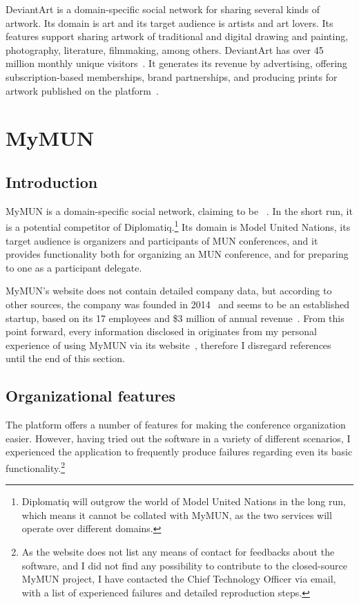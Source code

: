 DeviantArt is a domain-specific social network for sharing several kinds of artwork. Its domain is art and its target audience is artists and art lovers. Its features support sharing artwork of traditional and digital drawing and painting, photography, literature, filmmaking, among others. DeviantArt has over 45 million monthly unique visitors~\cite{about-deviantart}. It generates its revenue by advertising, offering subscription-based memberships, brand partnerships, and producing prints for artwork published on the platform~\cite{deviantart-revenue}.

\section{MyMUN}
\label{section:mymun}

\subsection{Introduction}

MyMUN is a domain-specific social network, claiming to be ~\cite{mymunwebsite}. In the short run, it is a potential competitor of Diplomatiq.\footnote{Diplomatiq will outgrow the world of Model United Nations in the long run, which means it cannot be collated with MyMUN, as the two services will operate over different domains.} Its domain is Model United Nations, its target audience is organizers and participants of MUN conferences, and it provides functionality both for organizing an MUN conference, and for preparing to one as a participant delegate.

MyMUN's website does not contain detailed company data, but according to other sources, the company was founded in 2014~\cite{mymunfacebook} and seems to be an established startup, based on its 17 employees and \$3 million of annual revenue~\cite{mymunzoominfo}. From this point forward, every information disclosed in  originates from my personal experience of using MyMUN via its website~\cite{mymunwebsite}, therefore I disregard references until the end of this section.

\subsection{Organizational features}

The platform offers a number of features for making the conference organization easier. However, having tried out the software in a variety of different scenarios, I experienced the application to frequently produce failures regarding even its basic functionality.\footnote{As the website does not list any means of contact for feedbacks about the software, and I did not find any possibility to contribute to the closed-source MyMUN project, I have contacted the Chief Technology Officer via email, with a list of experienced failures and detailed reproduction steps.}


